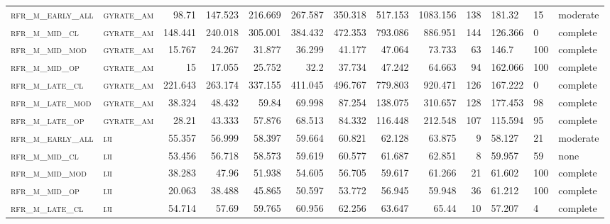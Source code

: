 \begin{landscape}
\begin{center}
\begin{longtable}{llrrrrr|rrr}
\textsc{rfr\_m\_early\_all} & \textsc{gyrate\_am}   & 98.71   & 147.523 & 216.669 & 267.587  & 350.318  & 517.153  & 1083.156 & 138    & 181.32        & 15            & moderate       \\
\textsc{rfr\_m\_mid\_cl   } & \textsc{gyrate\_am}   & 148.441 & 240.018 & 305.001 & 384.432  & 472.353  & 793.086  & 886.951  & 144    & 126.366       & 0             & complete           \\
\textsc{rfr\_m\_mid\_mod  } & \textsc{gyrate\_am}   & 15.767  & 24.267  & 31.877  & 36.299   & 41.177   & 47.064   & 73.733   & 63     & 146.7         & 100           & complete       \\
\textsc{rfr\_m\_mid\_op   } & \textsc{gyrate\_am}   & 15      & 17.055  & 25.752  & 32.2     & 37.734   & 47.242   & 64.663   & 94     & 162.066       & 100           & complete       \\
\textsc{rfr\_m\_late\_cl  } & \textsc{gyrate\_am}   & 221.643 & 263.174 & 337.155 & 411.045  & 496.767  & 779.803  & 920.471  & 126    & 167.222       & 0             & complete           \\
\textsc{rfr\_m\_late\_mod } & \textsc{gyrate\_am}   & 38.324  & 48.432  & 59.84   & 69.998   & 87.254   & 138.075  & 310.657  & 128    & 177.453       & 98            & complete       \\
\textsc{rfr\_m\_late\_op  } & \textsc{gyrate\_am}   & 28.21   & 43.333  & 57.876  & 68.513   & 84.332   & 116.448  & 212.548  & 107    & 115.594       & 95            & complete       \\
\textsc{rfr\_m\_early\_all} & \textsc{iji       }   & 55.357  & 56.999  & 58.397  & 59.664   & 60.821   & 62.128   & 63.875   & 9      & 58.127        & 21            & moderate       \\
\textsc{rfr\_m\_mid\_cl   } & \textsc{iji       }   & 53.456  & 56.718  & 58.573  & 59.619   & 60.577   & 61.687   & 62.851   & 8      & 59.957        & 59            & none       \\
\textsc{rfr\_m\_mid\_mod  } & \textsc{iji       }   & 38.283  & 47.96   & 51.938  & 54.605   & 56.705   & 59.617   & 61.266   & 21     & 61.602        & 100           & complete       \\
\textsc{rfr\_m\_mid\_op   } & \textsc{iji       }   & 20.063  & 38.488  & 45.865  & 50.597   & 53.772   & 56.945   & 59.948   & 36     & 61.212        & 100           & complete       \\
\textsc{rfr\_m\_late\_cl  } & \textsc{iji       }   & 54.714  & 57.69   & 59.765  & 60.956   & 62.256   & 63.647   & 65.44    & 10     & 57.207        & 4             & complete       \\

\end{longtable}
\end{center}
\end{landscape}
